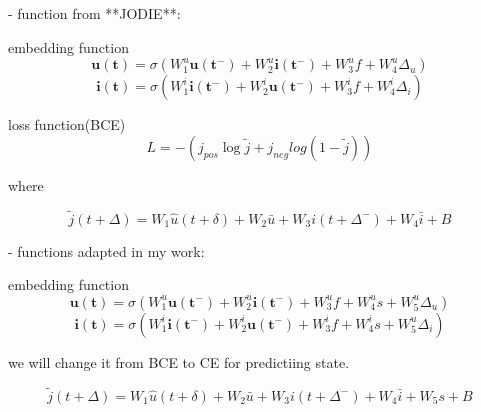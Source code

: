 - function from **JODIE**:

embedding function
$$ \mathbf{u(t)}=\sigma(W_1^u\mathbf{u(t^-)}+W_2^u\mathbf{i(t^-)}+W_3^uf+W^u_4 \Delta _u)$$
$$ \mathbf{i(t)}=\sigma(W_1^i\mathbf{i(t^-)}+W_2^i\mathbf{u(t^-)}+W_3^if+W^i_4 \Delta _i)$$

loss function(BCE)
$$L=-(j_{pos}\log{\tilde{j}}+j_{neg}log(1-\tilde{j}))$$

where

$$\tilde{j}(t+\Delta)=W_1\hat{u}(t+\delta)+W_2\bar{u}+W_3i(t+\Delta ^-)+W_4\bar{i}+B$$



- functions adapted in my work:

embedding function
$$ \mathbf{u(t)}=\sigma(W_1^u\mathbf{u(t^-)}+W_2^u\mathbf{i(t^-)}+W_3^uf+W^u_4s+W^u_5\Delta _u)$$
$$ \mathbf{i(t)}=\sigma(W_1^i\mathbf{i(t^-)}+W_2^i\mathbf{u(t^-)}+W_3^if+W^i_4s+W^u_5 \Delta _i)$$

we will change it from BCE to CE for predictiing state.

$$\tilde{j}(t+\Delta)=W_1\hat{u}(t+\delta)+W_2\bar{u}+W_3i(t+\Delta ^-)+W_4\bar{i}+W_5s+B$$